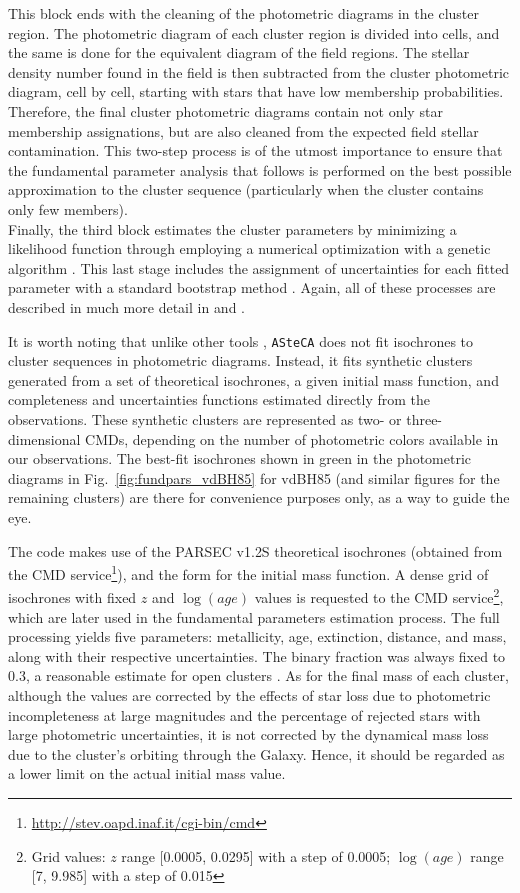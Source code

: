 \documentclass[draft]{aa}
\begin{document}
This block ends with the cleaning of the photometric diagrams in the cluster
region. The photometric diagram of each cluster region is divided into cells, and
the same is done for the equivalent diagram of the field regions. The stellar
density number found in the field is then subtracted from the cluster
photometric diagram, cell by cell, starting with stars that have low
membership probabilities. Therefore, the final cluster photometric diagrams
contain not only star membership assignations, but are also cleaned from the
expected field stellar contamination. This two-step process is of the utmost
importance to ensure that the fundamental parameter analysis that
follows is performed on the best possible approximation to the cluster
sequence (particularly when the cluster contains only few members).\\

Finally, the third block estimates the cluster parameters by minimizing a
likelihood function \citep{Dolphin_2002} through employing a numerical
optimization with a genetic algorithm \citep{Charbonneau_1995}. This last
stage includes the assignment of uncertainties for each fitted parameter with a
standard bootstrap method \citep{efron1986}. Again, all of these processes are
described in much more detail in \cite{Perren_2015} and \cite{Perren_2017}.

It is worth noting that unlike other tools \citep[e.g.,][]{Yen_2018},
\texttt{ASteCA} does not fit isochrones to cluster sequences in photometric
diagrams. Instead, it fits synthetic clusters generated from a set of
theoretical isochrones, a given initial mass function, and completeness and
uncertainties functions estimated directly from the observations.
These synthetic clusters are represented as two- or three-dimensional
CMDs, depending on the number of photometric colors
available in our observations. The best-fit isochrones shown in green in
the photometric diagrams in Fig.~\ref{fig:fundpars_vdBH85} for vdBH85 (and
similar figures for the remaining clusters) are there for convenience
purposes only, as a way to guide the eye.

The code makes use of the PARSEC v1.2S \citep{Bressan_2012} theoretical
isochrones (obtained from the CMD
service\footnote{\url{http://stev.oapd.inaf.it/cgi-bin/cmd}}), and the
\cite{Kroupa_2002} form for the initial mass function. A dense grid of
isochrones with fixed $z$ and $\log(age)$ values is requested to the CMD
service\footnote{Grid values: $z$ range [0.0005, 0.0295] with a step of
0.0005; $\log(age)$ range [7, 9.985] with a step of 0.015}, which are later
used in the fundamental parameters estimation
process. The full processing yields five parameters: metallicity, age,
extinction, distance, and mass, along with their respective uncertainties. The
binary fraction was always fixed to 0.3, a reasonable
estimate for open clusters \citep{Sollima_2010}. As for the final mass of each
cluster, although the values are corrected by the effects of star loss
due to photometric incompleteness at large magnitudes and the
percentage of rejected stars with large photometric uncertainties, it is not
corrected by the dynamical mass loss due to the cluster's orbiting through the
Galaxy. Hence, it should be regarded as a lower limit on the actual initial
mass value.
\end{document}
